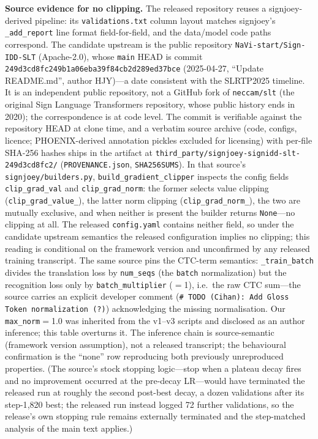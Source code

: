 \documentclass[pdflatex,sn-chicago]{sn-jnl}
\begin{document}
\textbf{Source evidence for no clipping.} The released repository reuses a signjoey-derived pipeline: its \texttt{validations.txt} column layout matches signjoey's \texttt{\_add\_report} line format field-for-field, and the data/model code paths correspond. The candidate upstream is the public repository \texttt{NaVi-start/Sign-IDD-SLT} (Apache-2.0), whose \texttt{main} HEAD is commit \texttt{249d3cd8fc249b1a06eba39f84cb2d289ed37bce} (2025-04-27, ``Update README.md'', author HJY)---a date consistent with the SLRTP2025 timeline. It is an independent public repository, not a GitHub fork of \texttt{neccam/slt} (the original Sign Language Transformers repository, whose public history ends in 2020); the correspondence is at code level. The commit is verifiable against the repository HEAD at clone time, and a verbatim source archive (code, configs, licence; PHOENIX-derived annotation pickles excluded for licensing) with per-file SHA-256 hashes ships in the artifact at \texttt{third\_party/signjoey-signidd-slt-249d3cd8fc2/} (\texttt{PROVENANCE.json}, \texttt{SHA256SUMS}). In that source's \texttt{signjoey/builders.py}, \texttt{build\_gradient\_clipper} inspects the config fields \texttt{clip\_grad\_val} and \texttt{clip\_grad\_norm}: the former selects value clipping (\texttt{clip\_grad\_value\_}), the latter norm clipping (\texttt{clip\_grad\_norm\_}), the two are mutually exclusive, and when neither is present the builder returns \texttt{None}---no clipping at all. The released \texttt{config.yaml} contains neither field, so under the candidate upstream semantics the released configuration implies no clipping; this reading is conditional on the framework version and unconfirmed by any released training transcript. The same source pins the CTC-term semantics: \texttt{\_train\_batch} divides the translation loss by \texttt{num\_seqs} (the \texttt{batch} normalization) but the recognition loss only by \texttt{batch\_multiplier} ($=$1), i.e.\ the raw CTC sum---the source carries an explicit developer comment (\texttt{\# TODO (Cihan): Add Gloss Token normalization (?)}) acknowledging the missing normalisation. Our \texttt{max\_norm}$=$1.0 was inherited from the v1--v3 scripts and disclosed as an author inference; this table overturns it. The inference chain is source-semantic (framework version assumption), not a released transcript; the behavioural confirmation is the ``none'' row reproducing both previously unreproduced properties. (The source's stock stopping logic---stop when a plateau decay fires and no improvement occurred at the pre-decay LR---would have terminated the released run at roughly the second post-best decay, a dozen validations after its step-1{,}820 best; the released run instead logged 72 further validations, so the release's own stopping rule remains externally terminated and the step-matched analysis of the main text applies.)
\end{document}
